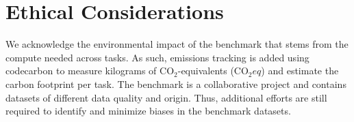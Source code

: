 \vspace{-3mm}
\section*{Ethical Considerations}

We acknowledge the environmental impact of the benchmark that stems from the compute needed across tasks. As such, emissions tracking is added using codecarbon \citep{benoit_courty_2024_11171501} to measure kilograms of CO$_2$-equivalents (CO$_2eq$) and estimate the carbon footprint per task. The benchmark is a collaborative project and contains datasets of different data quality and origin. Thus, additional efforts are still required to identify and minimize biases in the benchmark datasets. 
